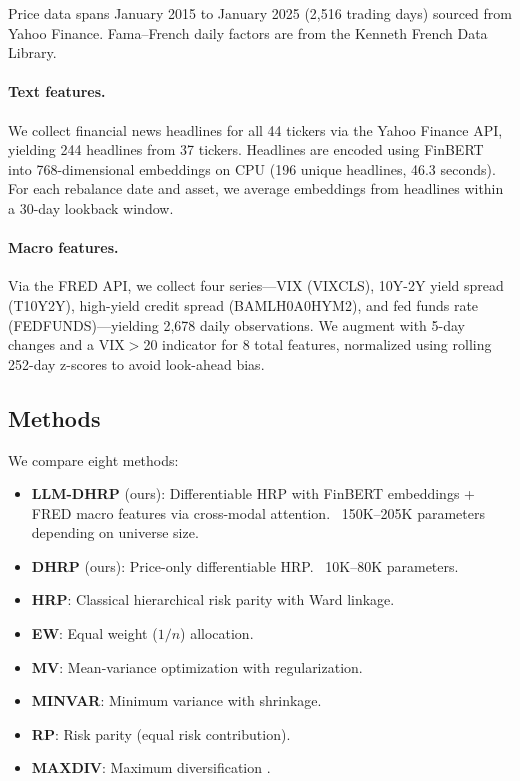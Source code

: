\documentclass[11pt]{article}
\begin{document}
Price data spans January 2015 to January 2025 (2,516 trading days) sourced from Yahoo Finance. Fama--French daily factors are from the Kenneth French Data Library.

\paragraph{Text features.} We collect financial news headlines for all 44 tickers via the Yahoo Finance API, yielding 244 headlines from 37 tickers. Headlines are encoded using FinBERT \citep{Araci2019} into 768-dimensional embeddings on CPU (196 unique headlines, 46.3 seconds). For each rebalance date and asset, we average embeddings from headlines within a 30-day lookback window.

\paragraph{Macro features.} Via the FRED API, we collect four series---VIX (VIXCLS), 10Y-2Y yield spread (T10Y2Y), high-yield credit spread (BAMLH0A0HYM2), and fed funds rate (FEDFUNDS)---yielding 2,678 daily observations. We augment with 5-day changes and a VIX$>$20 indicator for 8 total features, normalized using rolling 252-day z-scores to avoid look-ahead bias.

\subsection{Methods}

We compare eight methods:
\begin{itemize}
    \item \textbf{LLM-DHRP} (ours): Differentiable HRP with FinBERT embeddings + FRED macro features via cross-modal attention. ~150K--205K parameters depending on universe size.
    \item \textbf{DHRP} (ours): Price-only differentiable HRP. ~10K--80K parameters.
    \item \textbf{HRP}: Classical hierarchical risk parity \citep{LopezdePrado2016} with Ward linkage.
    \item \textbf{EW}: Equal weight ($1/n$) allocation.
    \item \textbf{MV}: Mean-variance optimization with regularization.
    \item \textbf{MINVAR}: Minimum variance with shrinkage.
    \item \textbf{RP}: Risk parity (equal risk contribution).
    \item \textbf{MAXDIV}: Maximum diversification \citep{Choueifaty2008}.
\end{itemize}
\end{document}
